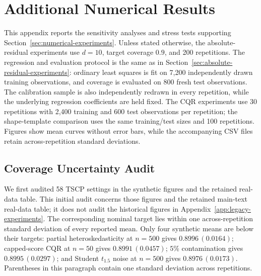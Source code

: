 
\begingroup
\color{blue}
\setlength{\emergencystretch}{2em}

\section{Additional Numerical Results}
\label{app:additional-experiments}

This appendix reports the sensitivity analyses and stress tests supporting
Section~\ref{sec:numerical-experiments}. Unless stated otherwise, the
absolute-residual experiments use $d=10$, target coverage $0.9$, and 200
repetitions. The regression and evaluation protocol is the same as in
Section~\ref{sec:absolute-residual-experiments}: ordinary least squares is fit
on 7,200 independently drawn training observations, and coverage is evaluated
on 800 fresh test observations. The calibration sample is also independently
redrawn in every repetition, while the underlying regression coefficients are
held fixed. The CQR experiments use 30 repetitions with 2,400 training and 600
test observations per repetition; the shape-template comparison uses the same
training/test sizes and 100 repetitions. Figures show mean curves without
error bars, while the accompanying CSV files retain across-repetition standard
deviations.

\subsection{Coverage Uncertainty Audit}
\label{app:coverage-uncertainty}

We first audited 58 TSCP settings in the synthetic figures and the retained
real-data table. This initial audit concerns those figures and the retained main-text
real-data table; it does not audit the historical figures in
Appendix~\ref{app:legacy-experiments}. The corresponding nominal target lies within one
across-repetition standard deviation of every reported mean. Only four
synthetic means are below their targets: partial heteroskedasticity at
$n=500$ gives $0.8996\,(0.0164)$; capped-score CQR at $n=50$ gives
$0.8991\,(0.0457)$; $5\%$ contamination gives $0.8995\,(0.0297)$; and
Student $t_{1.5}$ noise at $n=500$ gives $0.8976\,(0.0173)$. Parentheses in
this paragraph contain one standard deviation across repetitions.

